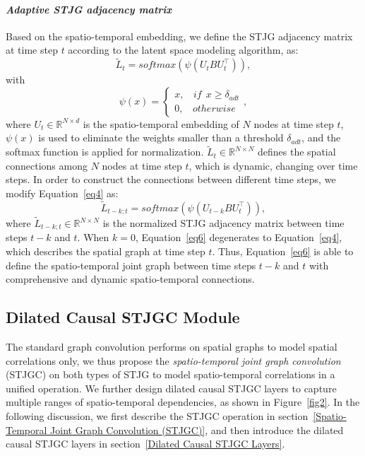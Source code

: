 \documentclass[10pt,journal,compsoc]{IEEEtran}
\begin{document}
\paragraph{\textbf{\textit{Adaptive STJG adjacency matrix}}} Based on the spatio-temporal embedding, we define the STJG adjacency matrix at time step $ t $ according to the latent space modeling algorithm, as:
%
\begin{equation}
\tilde{L}_{t}=softmax(\psi(U_tBU_t^\top)) 
\label{eq4},
\end{equation}
%
with
%
\begin{equation}
\psi(x) = \left\{ 
\begin{array}{lr}
x,~~~~if~~x \ge \delta_{adt} \\
0,~~~~otherwise 
\end{array}
\label{eq5},
\right.
\end{equation}
%
where $ U_t \in \mathbb{R}^{N \times d} $ is the spatio-temporal embedding of $ N $ nodes at time step $ t $, $ \psi(x) $ is used to eliminate the weights smaller than a threshold $ \delta_{adt} $, and the softmax function is applied for normalization. $ \tilde{L}_{t} \in \mathbb{R}^{N \times N} $ defines the spatial connections among $ N $ nodes at time step $ t $, which is dynamic, changing over time steps. In order to construct the connections between different time steps, we modify Equation~\ref{eq4} as:
%
\begin{equation}
\tilde{L}_{t-k;t}=softmax(\psi(U_{t-k}BU_t^\top))
\label{eq6},
\end{equation}
%   
where $ \tilde{L}_{t-k;t} \in \mathbb{R}^{N \times N} $ is the normalized STJG adjacency matrix between time steps $ t-k $ and $ t $. When $ k=0 $, Equation~\ref{eq6} degenerates to Equation~\ref{eq4}, which describes the spatial graph at time step $ t $. Thus, Equation~\ref{eq6} is able to define the spatio-temporal joint graph between time steps $ t-k $ and $ t $ with comprehensive and dynamic spatio-temporal connections.

\subsection{Dilated Causal STJGC Module} \label{Dilated Causal STJGC Module}

The standard graph convolution performs on spatial graphs to model spatial correlations only, we thus propose the \textit{spatio-temporal joint graph convolution} (STJGC) on both types of STJG to model spatio-temporal correlations in a unified operation. We further design dilated causal STJGC layers to capture multiple ranges of spatio-temporal dependencies, as shown in Figure~\ref{fig2}. In the following discussion, we first describe the STJGC operation in section~\ref{Spatio-Temporal Joint Graph Convolution (STJGC)}, and then introduce the dilated causal STJGC layers in section~\ref{Dilated Causal STJGC Layers}.  
\end{document}
